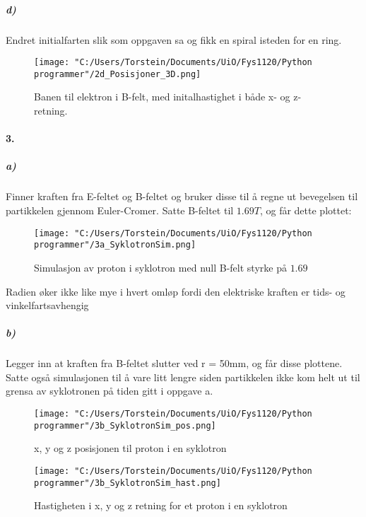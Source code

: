 \documentclass[11pt, A4paper,norsk]{article}
\begin{document}
	
	
	
	
	
	
	
	
			\subparagraph{d)}
				\begin{flushleft}
Endret initialfarten slik som oppgaven sa og fikk en spiral isteden for en ring.
				\end{flushleft}
				\begin{figure}
\texttt{[image: "C:/Users/Torstein/Documents/UiO/Fys1120/Python programmer"/2d\_Posisjoner\_3D.png]}
\caption{Banen til elektron i B-felt, med initalhastighet i både x- og z-retning.}
				\end{figure}
\clearpage







		\paragraph{3.}
			\subparagraph{a)}
				\begin{flushleft}
Finner kraften fra E-feltet og B-feltet og bruker disse til å regne ut bevegelsen til partikkelen gjennom Euler-Cromer. Satte B-feltet til $1.69T$, og får dette plottet: 
				\end{flushleft}
				\begin{figure}
\texttt{[image: "C:/Users/Torstein/Documents/UiO/Fys1120/Python programmer"/3a\_SyklotronSim.png]}
\caption{Simulasjon av proton i syklotron med null B-felt styrke på $1.69$}
				\end{figure}
				\begin{flushleft}
Radien øker ikke like mye i hvert omløp fordi den elektriske kraften er tids- og vinkelfartsavhengig
				\end{flushleft}
\clearpage






			\subparagraph{b)}
				\begin{flushleft}
Legger inn at kraften fra B-feltet slutter ved r = 50mm, og får disse plottene. Satte også simulasjonen til å vare litt lengre siden partikkelen ikke kom helt ut til grensa av syklotronen på tiden gitt i oppgave a.
				\end{flushleft}
\clearpage
				\begin{figure}
\texttt{[image: "C:/Users/Torstein/Documents/UiO/Fys1120/Python programmer"/3b\_SyklotronSim\_pos.png]}
\caption{x, y og z posisjonen til proton i en syklotron}
				\end{figure}
				\begin{figure}
\texttt{[image: "C:/Users/Torstein/Documents/UiO/Fys1120/Python programmer"/3b\_SyklotronSim\_hast.png]}
\caption{Hastigheten i x, y og z retning for et proton i en syklotron}
				\end{figure}
\clearpage
\end{document}

